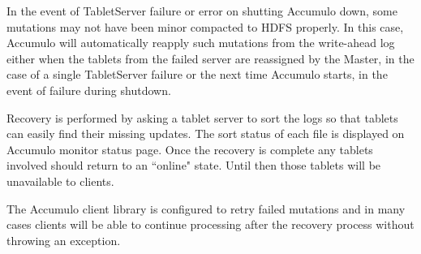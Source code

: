 In the event of TabletServer failure or error on shutting Accumulo down, some
mutations may not have been minor compacted to HDFS properly. In this case,
Accumulo will automatically reapply such mutations from the write-ahead log
either when the tablets from the failed server are reassigned by the Master, in the
case of a single TabletServer failure or the next time Accumulo starts, in the event of
failure during shutdown.

Recovery is performed by asking a tablet server to sort the logs so that tablets can easily find their missing
updates. The sort status of each file is displayed on
Accumulo monitor status page. Once the recovery is complete any
tablets involved should return to an ``online" state. Until then those tablets will be
unavailable to clients.

The Accumulo client library is configured to retry failed mutations and in many
cases clients will be able to continue processing after the recovery process without
throwing an exception.

